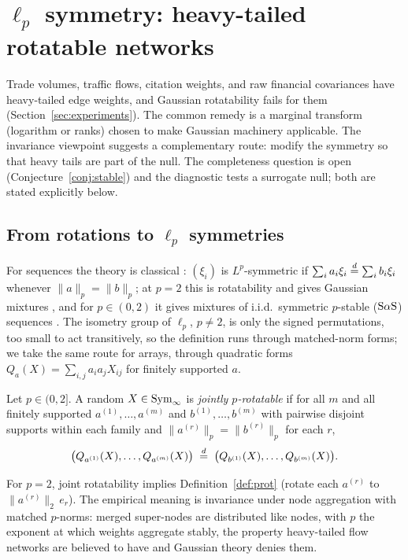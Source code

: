 \section{$\ell_p$ symmetry: heavy-tailed rotatable networks}
\label{sec:lp}

Trade volumes, traffic flows, citation weights, and raw financial
covariances have heavy-tailed edge weights, and Gaussian rotatability fails
for them (Section~\ref{sec:experiments}). The common remedy is a marginal
transform (logarithm or ranks) chosen to make Gaussian machinery
applicable. The invariance viewpoint suggests a complementary route: modify the
symmetry so that heavy tails are part of the null. The completeness
question is open (Conjecture~\ref{conj:stable}) and the diagnostic
tests a surrogate null; both are stated explicitly below.

\subsection{From rotations to $\ell_p$ symmetries}

For sequences the theory is classical
\citep[\S1.7]{kallenberg2005probabilistic}: $(\xi_i)$ is
$L^p$-symmetric if $\sum_i a_i\xi_i\overset{d}{=}\sum_i b_i\xi_i$ whenever
$\lVert a\rVert_p=\lVert b\rVert_p$; at $p=2$ this is rotatability and
gives Gaussian mixtures \citep{freedman1962invariants}, and for
$p\in(0,2)$ it gives mixtures of i.i.d.\ symmetric $p$-stable ($\mathrm{S}\alpha\mathrm{S}$)
sequences \citep{bretagnolle1966lois,cambanis1983alpha}. The isometry
group of $\ell_p$, $p\ne2$, is only the signed permutations, too small
to act transitively, so the definition runs through matched-norm forms;
we take the same route for arrays, through quadratic forms
$Q_a(X)=\sum_{i,j}a_ia_jX_{ij}$ for finitely supported $a$.

\begin{definition}
\label{def:prot}
Let $p\in(0,2]$. A random $X\in\mathrm{Sym}_\infty$ is \emph{jointly
$p$-rotatable} if for all $m$ and all finitely supported
$a^{(1)},\dots,a^{(m)}$ and $b^{(1)},\dots,b^{(m)}$ with pairwise disjoint
supports within each family and
$\lVert a^{(r)}\rVert_p=\lVert b^{(r)}\rVert_p$ for each $r$,
\[
\bigl(Q_{a^{(1)}}(X),\dots,Q_{a^{(m)}}(X)\bigr)
\;\overset{d}{=}\;
\bigl(Q_{b^{(1)}}(X),\dots,Q_{b^{(m)}}(X)\bigr).
\]
\end{definition}

For $p=2$, joint rotatability implies Definition~\ref{def:prot}
(rotate each $a^{(r)}$ to $\lVert a^{(r)}\rVert_2\,e_r$). The
empirical meaning is invariance under node aggregation with matched
$p$-norms: merged super-nodes are distributed like nodes, with $p$ the
exponent at which weights aggregate stably, the property heavy-tailed
flow networks are believed to have and Gaussian theory denies them.

